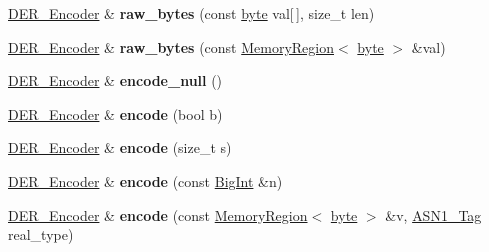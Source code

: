 \begin{DoxyCompactItemize}
\item 
\hypertarget{classBotan_1_1DER__Encoder_aaa82184c4e65db23eafdafa47d1bc045}{\hyperlink{classBotan_1_1DER__Encoder}{D\-E\-R\-\_\-\-Encoder} \& {\bfseries raw\-\_\-bytes} (const \hyperlink{namespaceBotan_a7d793989d801281df48c6b19616b8b84}{byte} val\mbox{[}$\,$\mbox{]}, size\-\_\-t len)}\label{classBotan_1_1DER__Encoder_aaa82184c4e65db23eafdafa47d1bc045}

\item 
\hypertarget{classBotan_1_1DER__Encoder_ac469d6e40ac972d1470dc8d362e1a1f5}{\hyperlink{classBotan_1_1DER__Encoder}{D\-E\-R\-\_\-\-Encoder} \& {\bfseries raw\-\_\-bytes} (const \hyperlink{classBotan_1_1MemoryRegion}{Memory\-Region}$<$ \hyperlink{namespaceBotan_a7d793989d801281df48c6b19616b8b84}{byte} $>$ \&val)}\label{classBotan_1_1DER__Encoder_ac469d6e40ac972d1470dc8d362e1a1f5}

\item 
\hypertarget{classBotan_1_1DER__Encoder_ac911e107e17552edf86d1f50d7a68fbe}{\hyperlink{classBotan_1_1DER__Encoder}{D\-E\-R\-\_\-\-Encoder} \& {\bfseries encode\-\_\-null} ()}\label{classBotan_1_1DER__Encoder_ac911e107e17552edf86d1f50d7a68fbe}

\item 
\hypertarget{classBotan_1_1DER__Encoder_aeac014f3d51ec632102d8a46736204b8}{\hyperlink{classBotan_1_1DER__Encoder}{D\-E\-R\-\_\-\-Encoder} \& {\bfseries encode} (bool b)}\label{classBotan_1_1DER__Encoder_aeac014f3d51ec632102d8a46736204b8}

\item 
\hypertarget{classBotan_1_1DER__Encoder_aa654ad993ebced8500ad9c7b713f7f5b}{\hyperlink{classBotan_1_1DER__Encoder}{D\-E\-R\-\_\-\-Encoder} \& {\bfseries encode} (size\-\_\-t s)}\label{classBotan_1_1DER__Encoder_aa654ad993ebced8500ad9c7b713f7f5b}

\item 
\hypertarget{classBotan_1_1DER__Encoder_a672214580d1c08007565370119ec8a66}{\hyperlink{classBotan_1_1DER__Encoder}{D\-E\-R\-\_\-\-Encoder} \& {\bfseries encode} (const \hyperlink{classBotan_1_1BigInt}{Big\-Int} \&n)}\label{classBotan_1_1DER__Encoder_a672214580d1c08007565370119ec8a66}

\item 
\hypertarget{classBotan_1_1DER__Encoder_a5294d4193dd708eb44ea976a55646cce}{\hyperlink{classBotan_1_1DER__Encoder}{D\-E\-R\-\_\-\-Encoder} \& {\bfseries encode} (const \hyperlink{classBotan_1_1MemoryRegion}{Memory\-Region}$<$ \hyperlink{namespaceBotan_a7d793989d801281df48c6b19616b8b84}{byte} $>$ \&v, \hyperlink{namespaceBotan_aaa08f67a945ef195fa39e62659dffa7a}{A\-S\-N1\-\_\-\-Tag} real\-\_\-type)}\label{classBotan_1_1DER__Encoder_a5294d4193dd708eb44ea976a55646cce}


\end{DoxyCompactItemize}
